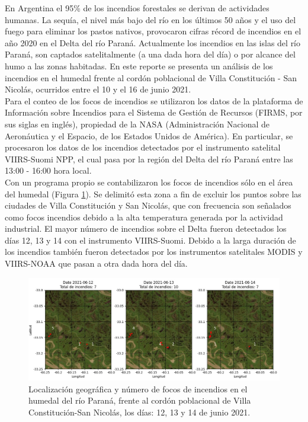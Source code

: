 En Argentina el 95\% de los incendios forestales se derivan de actividades humanas\cite{ministerio_2021}. La sequía, el nivel más bajo del río en los últimos 50 años y el uso del fuego para eliminar los pastos nativos\cite{borus_2020}, provocaron cifras récord de incendios en el año 2020 en el Delta del río Paraná. Actualmente los incendios en las islas del río Paraná, son captados satelitalmente (a una dada hora del día) o por alcance del humo a las zonas habitadas. En este reporte se presenta un análisis de los incendios en el humedal frente al cordón poblacional de Villa Constitución - San Nicolás, ocurridos entre el 10 y el 16 de junio 2021.\\

Para el conteo de los focos de incendios se utilizaron los datos de la plataforma de Información sobre Incendios para el Sistema de Gestión de Recursos (FIRMS, por sus siglas en inglés), propiedad de la NASA (Administración Nacional de Aeronáutica y el Espacio, de los Estados Unidos de América). En particular, se procesaron los datos de los incendios detectados por el instrumento satelital VIIRS-Suomi NPP, el cual pasa por la región del Delta del río Paraná entre las 13:00 - 16:00 hora local.\\

Con un programa propio se contabilizaron los focos de incendios sólo en el área del humedal (Figura \ref{fig:conteo}). Se delimitó esta zona a fin de excluir los puntos sobre las ciudades de Villa Constitución y San Nicolás, que con frecuencia son señalados como focos incendios debido a la alta temperatura generada por la actividad industrial. El mayor número de incendios sobre el Delta fueron detectados los días 12, 13 y 14 con el instrumento VIIRS-Suomi. Debido a la larga duración de los incendios también fueron detectados por los instrumentos satelitales MODIS y VIIRS-NOAA que pasan a otra dada hora del día.

\begin{figure}[H]
    \centering
    \includegraphics[width=0.8\paperwidth]{images/image2.jpg}
    \caption{Localización geográfica y número de focos de incendios en el humedal del río Paraná, frente al cordón poblacional de Villa Constitución-San Nicolás, los días: 12, 13 y 14 de junio 2021.}
    \label{fig:conteo}
\end{figure}

